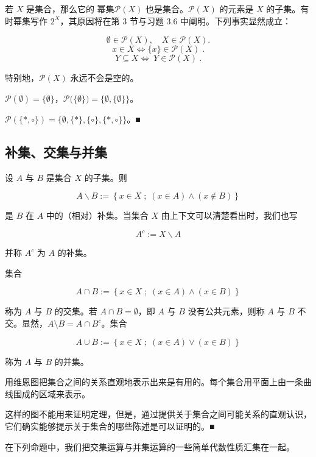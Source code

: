 若 $X$ 是集合，那么它的 $\text{幂} \mathbf{集} \mathcal{P}(X)$ 也是集合。$\mathcal{P}(X)$ 的元素是 $X$ 的子集。有时幂集写作 $2^X$，其原因将在第 3 节与习题 3.6 中阐明。下列事实显然成立：

\[
\emptyset\in\mathcal{P}(X),\quad X\in\mathcal{P}(X).
\]
\[
x\in X\Longleftrightarrow\{x\}\in\mathcal{P}(X)\;.
\]
\[
Y\subseteq X\Longleftrightarrow{~}Y\in\mathcal{P}(X)~.
\]

特别地，$ \mathcal{P}(X) $ 永远不会是空的。

\begin{example}

\begin{items}
\item

$ \mathcal{P}(\emptyset) = \{\emptyset\} $，$ \mathcal{P}\big(\{\emptyset\}\big) = \{\emptyset, \{\emptyset\}\} $。

\item

$ \mathcal{P}\left(\{*, \circ\}\right) = \{\emptyset, \{*\}, \{\circ\}, \{*, \circ\}\} $。■

\end{items}

\end{example}

\subsection*{补集、交集与并集}

设 $A$ 与 $B$ 是集合 $X$ 的子集。则

\[
A\backslash B:=\left\{x\in X\;;\;(x\in A)\land(x\notin B)\right\}
\]

是 $B$ 在 $A$ 中的（相对）补集。当集合 $X$ 由上下文可以清楚看出时，我们也写

\[
A^{c}:=X\backslash A
\]

并称 $ A^{c} $ 为 $A$ 的补集。

集合

\[
A\cap B:=\left\{x\in X\;;\;(x\in A)\land(x\in B)\right\}
\]

称为 $ A $ 与 $ B $ 的交集。若 $ A \cap B = \emptyset $，即 $ A $ 与 $ B $ 没有公共元素，则称 $ A $ 与 $ B $ 不交。显然，$ A \setminus B = A \cap B^c $。集合

\[
A\cup B:=\left\{x\in X\;;\;(x\in A)\lor(x\in B)\right\}
\]

称为 $A$ 与 $B$ 的并集。

\begin{remark}

用维恩图把集合之间的关系直观地表示出来是有用的。每个集合用平面上由一条曲线围成的区域来表示。


这样的图不能用来证明定理，但是，通过提供关于集合之间可能关系的直观认识，它们确实能够提示关于集合的哪些陈述是可以证明的。■

在下列命题中，我们把交集运算与并集运算的一些简单代数性质汇集在一起。

\end{remark}

